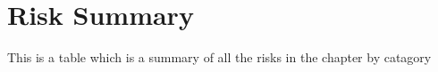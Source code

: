 
\chapter{Risk Summary} %

\label{Part4Chapter2} %


This is a table which is a summary of all the risks in the chapter  by catagory
